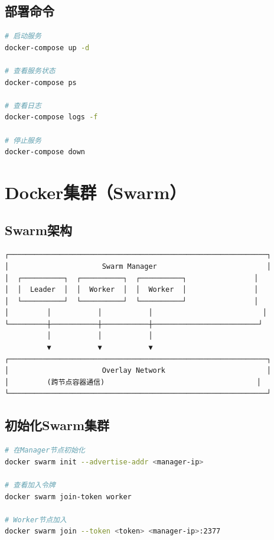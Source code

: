\documentclass[12pt,UTF8]{ctexbook}
\begin{document}
\subsection{部署命令}

\begin{lstlisting}[language=bash]
# 启动服务
docker-compose up -d

# 查看服务状态
docker-compose ps

# 查看日志
docker-compose logs -f

# 停止服务
docker-compose down
\end{lstlisting}

\section{Docker集群（Swarm）}
\label{sec:docker-swarm}

\subsection{Swarm架构}

\begin{lstlisting}
┌─────────────────────────────────────────────────────────────┐
│                      Swarm Manager                          │
│  ┌──────────┐  ┌──────────┐  ┌──────────┐                │
│  │  Leader  │  │  Worker  │  │  Worker  │                │
│  └──────────┘  └──────────┘  └──────────┘                │
│         │           │           │                          │
└─────────┼───────────┼───────────┼─────────────────────────┘
          │           │           │
          ▼           ▼           ▼
┌─────────────────────────────────────────────────────────────┐
│                      Overlay Network                        │
│         (跨节点容器通信)                                    │
└─────────────────────────────────────────────────────────────┘
\end{lstlisting}

\subsection{初始化Swarm集群}

\begin{lstlisting}[language=bash]
# 在Manager节点初始化
docker swarm init --advertise-addr <manager-ip>

# 查看加入令牌
docker swarm join-token worker

# Worker节点加入
docker swarm join --token <token> <manager-ip>:2377
\end{lstlisting}
\end{document}
